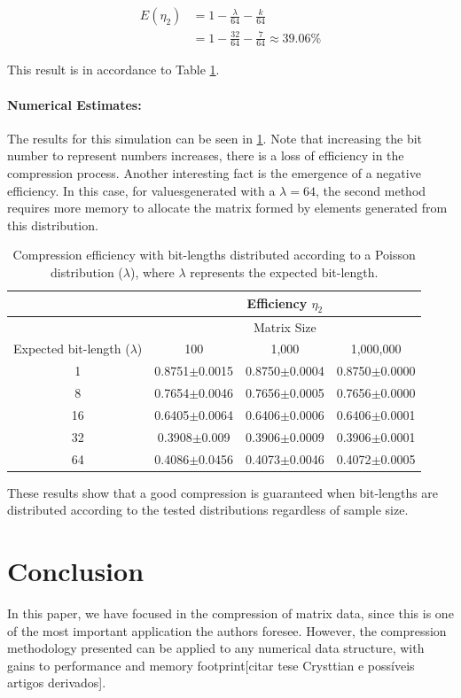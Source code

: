 \documentclass[10pt]{article}
\begin{document}
\begin{align}\label{eq:49}
 E(\eta_2) &= 1 - \frac{\lambda}{64} - \frac{k}{64} \\
 &= 1 - \frac{32}{64} - \frac{7}{64} \approx 39.06\%
\end{align}

This result is in accordance to Table \ref{tab:05}.
\paragraph{Numerical Estimates:}
The results for this simulation can be seen in \ref{tab:05}. Note that increasing the bit number to represent numbers increases, there is a loss of efficiency in the compression process. Another interesting fact is the emergence of a negative efficiency. In this case, for values ​​generated with a $\lambda=64$, the second method requires more memory to allocate the matrix formed by elements generated from this distribution.

 \begin{table}[h]
   \centering
   \caption{Compression efficiency with bit-lengths distributed according to a Poisson distribution ($\lambda$), where $\lambda$ represents the expected bit-length.}
  \begin{tabular}{cccc}
      \hline
      &&Efficiency $\eta_2$      & \\
      \hline
      &&Matrix Size& \\
      Expected bit-length ($\lambda$)	& 100	& 1,000		    & 1,000,000 \\
      \hline
      1 	& 0.8751$\pm$0.0015 	& 0.8750$\pm$0.0004 & 0.8750$\pm$0.0000 \\ 
      8 	& 0.7654$\pm$0.0046 	& 0.7656$\pm$0.0005 & 0.7656$\pm$0.0000 \\ 
      16 	& 0.6405$\pm$0.0064 	& 0.6406$\pm$0.0006 & 0.6406$\pm$0.0001 \\ 
      32 	& 0.3908$\pm$0.009 	& 0.3906$\pm$0.0009 & 0.3906$\pm$0.0001 \\ 
      64 	& 0.4086$\pm$0.0456 	& 0.4073$\pm$0.0046 & 0.4072$\pm$0.0005 \\ 
      \hline
  \end{tabular}
  \label{tab:05}
 \end{table}

These results show that a good compression is guaranteed when bit-lengths are distributed according to the tested distributions regardless of sample size.

\section{Conclusion}
In this paper, we have focused in the compression of matrix data, since this is one of the most important application the authors foresee. However, the compression methodology presented can be applied to any numerical data structure, with gains to performance and memory footprint[citar tese Crysttian e possíveis artigos derivados]. 
\end{document}
